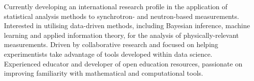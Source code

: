 \vspace{0.25cm}

\begin{cvparagraph}

Currently developing an international research profile in the application of statistical analysis methods to synchrotron- and neutron-based measurements. 
Interested in utilising data-driven methods, including Bayesian inference, machine learning and applied information theory, for the analysis of physically-relevant measurements.
Driven by collaborative research and focused on helping experimentists take advantage of tools developed within data science. 
Experienced educator and developer of open education resources, passionate on improving familiarity with mathematical and computational tools.
\end{cvparagraph}